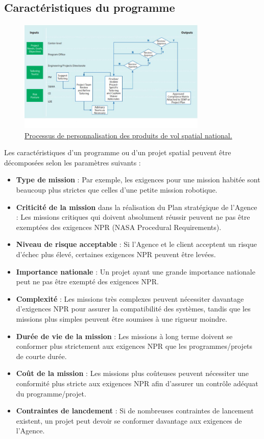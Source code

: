 \subsection{Caractéristiques du programme}
\begin{figure}[H] %
    \centering
    \includegraphics[width=0.8\textwidth]{figures/3.1.jpg}
    \caption{\href{https://www.nasa.gov/wp-content/uploads/2018/09/nasa_systems_engineering_handbook_0.pdf?emrc=4096b9}{Processus de personnalisation des produits de vol spatial national.}}
    \label{fig:communication2}
\end{figure}
Les caractéristiques d’un programme ou d’un projet spatial peuvent être décomposées selon les paramètres suivants :  
\begin{itemize}
    \item \textbf{Type de mission} : Par exemple, les exigences pour une mission habitée sont beaucoup plus strictes que celles d’une petite mission robotique.  
    \item \textbf{Criticité de la mission} dans la réalisation du Plan stratégique de l’Agence : Les missions critiques qui doivent absolument réussir peuvent ne pas être exemptées des exigences NPR (NASA Procedural Requirements).  
    \item \textbf{Niveau de risque acceptable} : Si l’Agence et le client acceptent un risque d’échec plus élevé, certaines exigences NPR peuvent être levées.  
    \item \textbf{Importance nationale} : Un projet ayant une grande importance nationale peut ne pas être exempté des exigences NPR.  
    \item \textbf{Complexité} : Les missions très complexes peuvent nécessiter davantage d’exigences NPR pour assurer la compatibilité des systèmes, tandis que les missions plus simples peuvent être soumises à une rigueur moindre.  
    \item \textbf{Durée de vie de la mission} : Les missions à long terme doivent se conformer plus strictement aux exigences NPR que les programmes/projets de courte durée.  
    \item \textbf{Coût de la mission} : Les missions plus coûteuses peuvent nécessiter une conformité plus stricte aux exigences NPR afin d’assurer un contrôle adéquat du programme/projet.  
    \item \textbf{Contraintes de lancdement} : Si de nombreuses contraintes de lancement existent, un projet peut devoir se conformer davantage aux exigences de l’Agence.  
\end{itemize}
